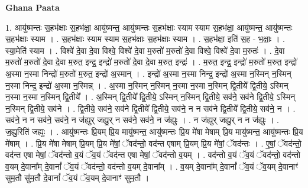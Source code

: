 \documentclass[17pt]{extarticle}
\begin{document}
\textbf{Ghana Paata } \newline

1. आयु॑ष्मन्तः स॒हभ॑क्षाः स॒हभ॑क्षा॒ आयु॑ष्मन्त॒ आयु॑ष्मन्तः स॒हभ॑क्षाः स्याम स्याम स॒हभ॑क्षा॒ आयु॑ष्मन्त॒ आयु॑ष्मन्तः स॒हभ॑क्षाः स्याम । . स॒हभ॑क्षाः स्याम स्याम स॒हभ॑क्षाः स॒हभ॑क्षाः स्याम । . स॒हभ॑क्षा॒ इति॑ स॒ह - भ॒क्षाः॒ । . स्या॒मेति॑ स्याम । . विश्वे॑ दे॒वा दे॒वा विश्वे॒ विश्वे॑ दे॒वा म॒रुतो॑ म॒रुतो॑ दे॒वा विश्वे॒ विश्वे॑ दे॒वा म॒रुतः॑ । . दे॒वा म॒रुतो॑ म॒रुतो॑ दे॒वा दे॒वा म॒रुत॒ इन्द्र॒ इन्द्रो॑ म॒रुतो॑ दे॒वा दे॒वा म॒रुत॒ इन्द्रः॑ । . म॒रुत॒ इन्द्र॒ इन्द्रो॑ म॒रुतो॑ म॒रुत॒ इन्द्रो॑ अ॒स्मा न॒स्मा निन्द्रो॑ म॒रुतो॑ म॒रुत॒ इन्द्रो॑ अ॒स्मान् । . इन्द्रो॑ अ॒स्मा न॒स्मा निन्द्र॒ इन्द्रो॑ अ॒स्मा न॒स्मिन् न॒स्मिन् न॒स्मा निन्द्र॒ इन्द्रो॑ अ॒स्मा न॒स्मिन्न् । . अ॒स्मा न॒स्मिन् न॒स्मिन् न॒स्मा न॒स्मा न॒स्मिन् द्वि॒तीये᳚ द्वि॒तीये॒ ऽस्मिन् न॒स्मा न॒स्मा न॒स्मिन् द्वि॒तीये᳚ । . अ॒स्मिन् द्वि॒तीये᳚ द्वि॒तीये॒ ऽस्मिन् न॒स्मिन् द्वि॒तीये॒ सव॑ने॒ सव॑ने द्वि॒तीये॒ ऽस्मिन् न॒स्मिन् द्वि॒तीये॒ सव॑ने । . द्वि॒तीये॒ सव॑ने॒ सव॑ने द्वि॒तीये᳚ द्वि॒तीये॒ सव॑ने॒ न न सव॑ने द्वि॒तीये᳚ द्वि॒तीये॒ सव॑ने॒ न । . सव॑ने॒ न न सव॑ने॒ सव॑ने॒ न ज॑ह्युर् जह्यु॒र् न सव॑ने॒ सव॑ने॒ न ज॑ह्युः । . न ज॑ह्युर् जह्यु॒र् न न ज॑ह्युः । . ज॒ह्यु॒रिति॑ जह्युः । . आयु॑ष्मन्तः प्रि॒यम् प्रि॒य मायु॑ष्मन्त॒ आयु॑ष्मन्तः प्रि॒य मे॑षा मेषाम् प्रि॒य मायु॑ष्मन्त॒ आयु॑ष्मन्तः प्रि॒य मे॑षाम् । . प्रि॒य मे॑षा मेषाम् प्रि॒यम् प्रि॒य मे॑षां॒ ॅवद॑न्तो॒ वद॑न्त एषाम् प्रि॒यम् प्रि॒य मे॑षां॒ ॅवद॑न्तः । . ए॒षां॒ ॅवद॑न्तो॒ वद॑न्त एषा मेषां॒ ॅवद॑न्तो व॒यं ॅव॒यं ॅवद॑न्त एषा मेषां॒ ॅवद॑न्तो व॒यम् । . वद॑न्तो व॒यं ॅव॒यं ॅवद॑न्तो॒ वद॑न्तो व॒यम् दे॒वाना᳚म् दे॒वानां᳚ ॅव॒यं ॅवद॑न्तो॒ वद॑न्तो व॒यम् दे॒वाना᳚म् । . व॒यम् दे॒वाना᳚म् दे॒वानां᳚ ॅव॒यं ॅव॒यम् दे॒वानाꣳ॑ सुम॒तौ सु॑म॒तौ दे॒वानां᳚ ॅव॒यं ॅव॒यम् दे॒वानाꣳ॑ सुम॒तौ । \newline
\end{document}

